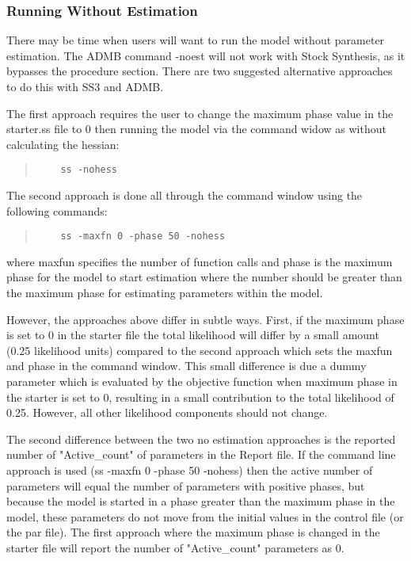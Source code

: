 \hypertarget{NoEst}{}
\subsubsection{Running Without Estimation}
There may be time when users will want to run the model without parameter estimation. The ADMB command -noest will not work with Stock Synthesis, as it bypasses the procedure section. There are two suggested alternative approaches to do this with SS3 and ADMB.  

The first approach requires the user to change the maximum phase value in the starter.ss file to 0 then running the model via the command widow as without calculating the hessian:

\begin{quote}
	\begin{verbatim}
	ss -nohess
	\end{verbatim}
\end{quote}

The second approach is done all through the command window using the following commands:

\begin{quote}
	\begin{verbatim}
	ss -maxfn 0 -phase 50 -nohess
	\end{verbatim}
\end{quote}

where maxfun specifies the number of function calls and phase is the maximum phase for the model to start estimation where the number should be greater than the maximum phase for estimating parameters within the model. 

However, the approaches above differ in subtle ways. First, if the maximum phase is set to 0 in the starter file the total likelihood will differ by a small amount (0.25 likelihood units) compared to the second approach which sets the maxfun and phase in the command window. This small difference is due a dummy parameter which is evaluated by the objective function when maximum phase in the starter is set to 0, resulting in a small contribution to the total likelihood of 0.25.  However, all other likelihood components should not change.  

The second difference between the two no estimation approaches is the reported number of "Active\_count" of parameters in the Report file. If the command line approach is used (ss -maxfn 0 -phase 50 -nohess) then the active number of parameters will equal the number of parameters with positive phases, but because the model is started in a phase greater than the maximum phase in the model, these parameters do not move from the initial values in the control file (or the par file).  The first approach where the maximum phase is changed in the starter file will report the number of "Active\_count" parameters as 0.  

